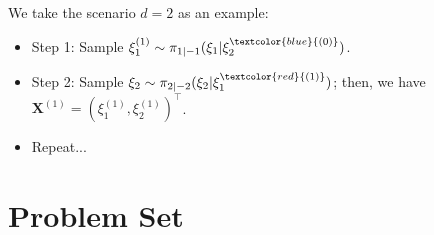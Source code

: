 \documentclass[11pt,letterpaper, leqno]{article}
\numberwithin{equation}{section}
\numberwithin{theorem}{section}
\numberwithin{lemma}{section}
\numberwithin{corollary}{section}
\numberwithin{definition}{section}
\numberwithin{proposition}{section}
\numberwithin{remark}{section}
\numberwithin{example}{section}
\newcommand{\T}{\intercal}
\begin{document}
We take the scenario $d=2$ as an example:
\begin{itemize}
    \item Step 1: Sample $\xi_1^{(1)}\sim \pi_{1\vert-1}(\xi_1\vert \xi_2^{\textcolor{blue}{(0)}})$.
    \item Step 2: Sample $\xi_2\sim\pi_{2\vert-2}(\xi_2\vert\xi_1^{\textcolor{red}{(1)}})$; then, we have $\boldsymbol{X}^{(1)}=(\xi_1^{(1)}, \xi_2^{(1)})^\T$.
    \item Repeat...
\end{itemize}


\newpage

\section{Problem Set}
\end{document}
